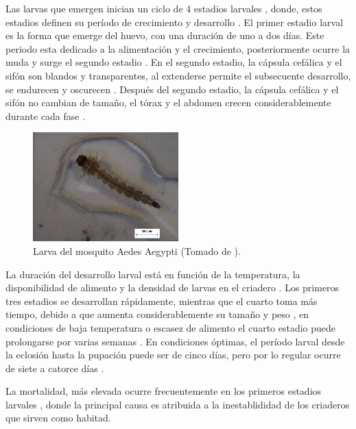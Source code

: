 Las larvas que emergen inician un ciclo de 4 estadios larvales \cite{web-site:gMonteroBiologia},
donde, estos estadios definen su período de crecimiento y desarrollo \cite{ThironIzcazaJ2003}. El
primer estadio larval es la forma que emerge del huevo, con una duración de uno a dos días. Este
periodo esta dedicado a la alimentación y el crecimiento, posteriormente ocurre la muda y surge el
segundo estadio \cite{ThironIzcazaJ2003}. En el segundo estadio, la cápsula cefálica y el sifón
son blandos y transparentes, al extenderse permite el subsecuente desarrollo, se endurecen y
oscurecen \cite{ThironIzcazaJ2003}. Después del segundo estadio, la cápsula cefálica y el sifón no
cambian de tamaño, el tórax y el abdomen crecen considerablemente durante cada fase
\cite{ThironIzcazaJ2003}.

\begin{figure}
\centering
\includegraphics[width=0.5\textwidth]{capitulo-3/graphics/larva.png}
\caption{\label{fig:cap3-larvas} Larva del mosquito Aedes Aegypti (Tomado de
\cite{sivanathan2006ecology}).}
\end{figure}

La duración del desarrollo larval está en función de la temperatura, la disponibilidad de alimento
y la densidad de larvas en el criadero \cite{ThironIzcazaJ2003}. Los primeros tres estadios se
desarrollan rápidamente, mientras que el cuarto toma más tiempo, debido a que aumenta
considerablemente su tamaño y peso \cite{ThironIzcazaJ2003, web-site:gMonteroBiologia},
en condiciones de baja temperatura o escasez de alimento el cuarto estadio puede prolongarse por
varias semanas \cite{ThironIzcazaJ2003}. En condiciones óptimas, el período larval desde la
eclosión hasta la pupación puede ser de cinco días, pero por lo regular ocurre de siete a catorce
días \cite{ThironIzcazaJ2003}.

La mortalidad, más elevada ocurre frecuentemente en los primeros estadios larvales
\cite{ThironIzcazaJ2003}, donde la principal causa es atribuida a la inestablididad de los
criaderos que sirven como habitad.

